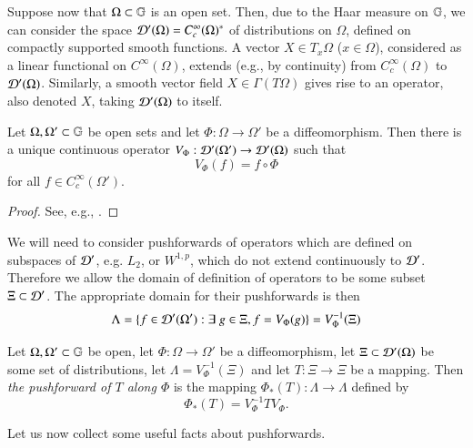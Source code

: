 \documentclass[leqno]{amsart}
\begin{document}
	\begin{remark}\label{pushforwardoperators}
		Suppose now that $\Omega\subset\mathbb{G}$ is an open set. Then, due to the Haar measure on $\mathbb{G}$, we can consider the space ${\mathcal D}'(\Omega)=C_c^\infty(\Omega)^*$ of distributions on $\Omega$, defined on compactly supported smooth functions. A vector $X\in T_x\Omega$ ($x\in\Omega$), considered as a linear functional on $C^\infty(\Omega)$, extends (e.g., by continuity) from $C^\infty_c(\Omega)$ to ${\mathcal D}'(\Omega)$. Similarly, a smooth vector field $X\in\Gamma(T\Omega)$ gives rise to an operator, also denoted $X$, taking ${\mathcal D}'(\Omega)$ to itself.
	\end{remark}
	\begin{theorem}\label{Vdef}
		Let $\Omega,\Omega'\subset\mathbb{G}$ be open sets and let $\Phi:\Omega\to\Omega'$ be a diffeomorphism. Then there is a unique continuous operator $V_\Phi:{\mathcal D}'(\Omega')\to{\mathcal D}'(\Omega)$ such that
		$$V_\Phi(f)=f\circ\Phi$$
		for all $f\in C^\infty_c(\Omega')$.
	\end{theorem}
	\begin{proof}
		See, e.g., \cite[Theorem 6.1.2]{hormander}.
	\end{proof}
	We will need to consider pushforwards of operators which are defined on subspaces of ${\mathcal D}'$, e.g. $L_2$, or $W^{1,p}$, which do not extend continuously to ${\mathcal D}'$. Therefore we allow the domain of definition of operators to be some subset $\Xi\subset{\mathcal D}'$. The appropriate domain for their pushforwards is then $$\Lambda=\{f\in{\mathcal D}'(\Omega'):\exists\; g\in \Xi, f=V_\Phi(g)\}=V_{\Phi}^{-1}(\Xi)$$
	\begin{definition}\label{pushforwarddef}
		Let $\Omega,\Omega'\subset\mathbb{G}$ be open, let $\Phi:\Omega\to\Omega'$ be a diffeomorphism, let $\Xi\subset{\mathcal D}'(\Omega)$ be some set of distributions, let $\Lambda=V_{\Phi}^{-1}(\Xi)$ and let $T:\Xi\to \Xi$ be a mapping. Then \textit{the pushforward of $T$ along $\Phi$} is the mapping $\Phi_*(T): \Lambda\to \Lambda$ defined by
		\begin{equation}\label{simple}
			\Phi_*(T)=V_\Phi^{-1} T V_\Phi.
		\end{equation}
	\end{definition}
	Let us now collect some useful facts about pushforwards.
\end{document}
